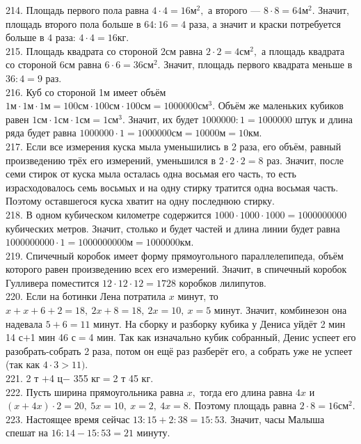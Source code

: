 214. Площадь первого пола равна $4\cdot4=16\text{м}^2,$ а второго --- $8\cdot8=64\text{м}^2.$ Значит, площадь второго пола больше в $64:16=4$ раза, а значит и краски потребуется больше в $4$ раза: $4\cdot4=16$кг.\\
215. Площадь квадрата со стороной 2см равна $2\cdot2=4\text{см}^2,$ а площадь квадрата со стороной 6см равна $6\cdot6=36\text{см}^2.$ Значит, площадь первого квадрата меньше в $36:4=9$ раз.\\
216. Куб со стороной 1м имеет объём $1\text{м}\cdot1\text{м}\cdot1\text{м}=100\text{см}\cdot100\text{см}\cdot100\text{см}=1000000\text{см}^3.$ Объём же маленьких кубиков равен $1\text{см}\cdot1\text{см}\cdot1\text{см}=1\text{см}^3.$ Значит, их будет $1000000:1=1000000$ штук и длина ряда будет равна
$1000000\cdot1=1000000\text{см}=10000\text{м}=10$км.\\
217. Если все измерения куска мыла уменьшились в 2 раза, его объём, равный произведению трёх его измерений, уменьшился в $2\cdot2\cdot2=8$ раз. Значит, после семи стирок от куска мыла осталась одна восьмая его часть, то есть израсходовалось семь восьмых и на одну стирку тратится одна восьмая часть. Поэтому оставшегося куска хватит на одну последнюю стирку.\\
218. В одном кубическом километре содержится $1000\cdot1000\cdot1000=1000000000$ кубических метров. Значит, столько и будет частей и длина линии будет равна $1000000000\cdot1=1000000000$м$=1000000$км.\\
219. Спичечный коробок имеет форму прямоугольного параллелепипеда, объём которого равен произведению всех его измерений. Значит, в спичечный коробок Гулливера поместится $12\cdot12\cdot12=1728$ коробков лилипутов.\\
220. Если на ботинки Лена потратила $x$ минут, то  $x+x+6+2=18,\ 2x+8=18,\ 2x=10,\ x=5$ минут. Значит, комбинезон она надевала $5+6=11$ минут. На сборку и разборку кубика у Дениса уйдёт 2 мин 14 с$+$1 мин 46 с$=$4 мин. Так как изначально кубик собранный, Денис успеет его разобрать-собрать 2 раза, потом он ещё раз разберёт его, а собрать уже не успеет (так как $4\cdot3>11).$\\
221. 2 т $+$4 ц$-$ 355 кг$=$2 т 45 кг.\\
222. Пусть ширина прямоугольника равна $x,$ тогда его длина равна $4x$ и $(x+4x)\cdot2=20,\ 5x=10,\ x=2,\ 4x=8.$ Поэтому площадь равна $2\cdot8=16\text{см}^2.$\\
223. Настоящее время сейчас $13:15+2:38=15:53.$ Значит, часы Малыша спешат на $16:14-15:53=21$ минуту.\\
